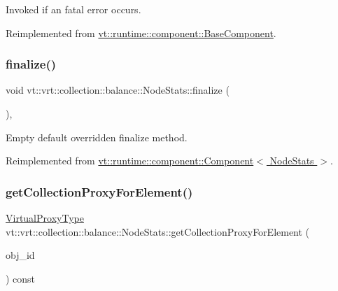 Invoked if an fatal error occurs. 



Reimplemented from \hyperlink{structvt_1_1runtime_1_1component_1_1_base_component_a43eeed44aa64c77f5491abb4f5a39e9a}{vt\+::runtime\+::component\+::\+Base\+Component}.

\mbox{\label{structvt_1_1vrt_1_1collection_1_1balance_1_1_node_stats_a267ac0f73734b89797be774b0bd6e7d1}} 
\subsubsection{\texorpdfstring{finalize()}{finalize()}}
{\footnotesize\ttfamily void vt\+::vrt\+::collection\+::balance\+::\+Node\+Stats\+::finalize (\begin{DoxyParamCaption}{ }\end{DoxyParamCaption})\hspace{0.3cm}{\ttfamily [override]}, {\ttfamily [virtual]}}



Empty default overridden finalize method. 



Reimplemented from \hyperlink{structvt_1_1runtime_1_1component_1_1_component_a098e362de01af6054e5491fba671a959}{vt\+::runtime\+::component\+::\+Component$<$ Node\+Stats $>$}.

\mbox{\label{structvt_1_1vrt_1_1collection_1_1balance_1_1_node_stats_a3ffd0aa6433163a9d455d6819ac44fca}} 
\subsubsection{\texorpdfstring{get\+Collection\+Proxy\+For\+Element()}{getCollectionProxyForElement()}}
{\footnotesize\ttfamily \hyperlink{namespacevt_a1b417dd5d684f045bb58a0ede70045ac}{Virtual\+Proxy\+Type} vt\+::vrt\+::collection\+::balance\+::\+Node\+Stats\+::get\+Collection\+Proxy\+For\+Element (\begin{DoxyParamCaption}\item[{\hyperlink{namespacevt_1_1vrt_1_1collection_1_1balance_a9f5b53fafb270212279a4757d2c4cd28}{Element\+I\+D\+Struct}}]{obj\+\_\+id }\end{DoxyParamCaption}) const}




